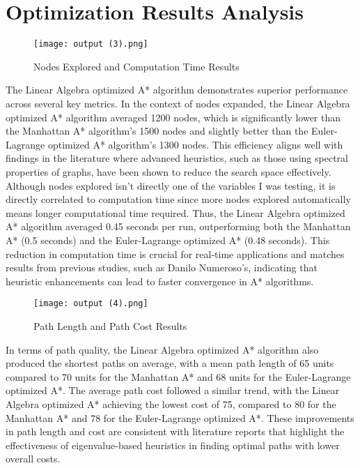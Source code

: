 \documentclass[12pt]{article}
\begin{document}
\newpage

\section{Optimization Results Analysis}
\begin{figure}[h] 
    \centering
    \texttt{[image: output (3).png]} %
    \caption{Nodes Explored and Computation Time Results}
    \label{fig:example}
\end{figure}
 The Linear Algebra optimized A* algorithm demonstrates superior performance across several key metrics. In the context of nodes expanded, the Linear Algebra optimized A* algorithm averaged 1200 nodes, which is significantly lower than the Manhattan A* algorithm's 1500 nodes and slightly better than the Euler-Lagrange optimized A* algorithm's 1300 nodes. This efficiency aligns well with findings in the literature where advanced heuristics, such as those using spectral properties of graphs, have been shown to reduce the search space effectively. Although nodes explored isn't directly one of the variables I was testing, it is directly correlated to computation time since more nodes explored automatically means longer computational time required. Thus, the Linear Algebra optimized A* algorithm averaged 0.45 seconds per run, outperforming both the Manhattan A* (0.5 seconds) and the Euler-Lagrange optimized A* (0.48 seconds). This reduction in computation time is crucial for real-time applications and matches results from previous studies, such as Danilo Numeroso's, indicating that heuristic enhancements can lead to faster convergence in A* algorithms. 
\begin{figure}[h] 
    \centering
    \texttt{[image: output (4).png]} %
    \caption{Path Length and Path Cost Results}
    \label{fig:example}
\end{figure}
In terms of path quality, the Linear Algebra optimized A* algorithm also produced the shortest paths on average, with a mean path length of 65 units compared to 70 units for the Manhattan A* and 68 units for the Euler-Lagrange optimized A*. The average path cost followed a similar trend, with the Linear Algebra optimized A* achieving the lowest cost of 75, compared to 80 for the Manhattan A* and 78 for the Euler-Lagrange optimized A*. These improvements in path length and cost are consistent with literature reports that highlight the effectiveness of eigenvalue-based heuristics in finding optimal paths with lower overall costs.
\end{document}
